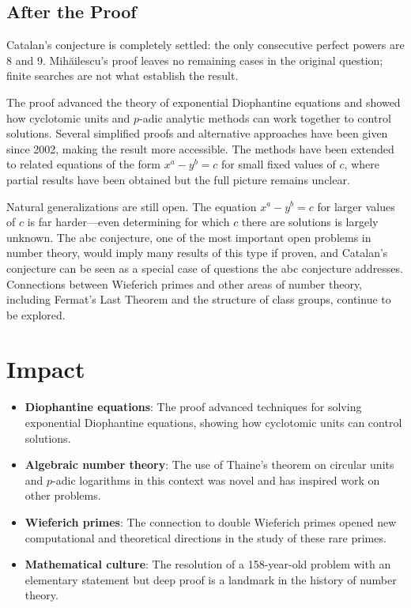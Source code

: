 \subsection{After the Proof}

Catalan's conjecture is completely settled: the only consecutive perfect powers are 8 and 9. Mihăilescu's proof leaves no remaining cases in the original question; finite searches are not what establish the result.

The proof advanced the theory of exponential Diophantine equations and showed how cyclotomic units and $p$-adic analytic methods can work together to control solutions. Several simplified proofs and alternative approaches have been given since 2002, making the result more accessible. The methods have been extended to related equations of the form $x^a - y^b = c$ for small fixed values of $c$, where partial results have been obtained but the full picture remains unclear.

Natural generalizations are still open. The equation $x^a - y^b = c$ for larger values of $c$ is far harder---even determining for which $c$ there are solutions is largely unknown. The abc conjecture, one of the most important open problems in number theory, would imply many results of this type if proven, and Catalan's conjecture can be seen as a special case of questions the abc conjecture addresses. Connections between Wieferich primes and other areas of number theory, including Fermat's Last Theorem and the structure of class groups, continue to be explored.

\section{Impact}

\begin{itemize}
\item \textbf{Diophantine equations}: The proof advanced techniques for solving exponential Diophantine equations, showing how cyclotomic units can control solutions.
\item \textbf{Algebraic number theory}: The use of Thaine's theorem on circular units and $p$-adic logarithms in this context was novel and has inspired work on other problems.
\item \textbf{Wieferich primes}: The connection to double Wieferich primes opened new computational and theoretical directions in the study of these rare primes.
\item \textbf{Mathematical culture}: The resolution of a 158-year-old problem with an elementary statement but deep proof is a landmark in the history of number theory.
\end{itemize}

